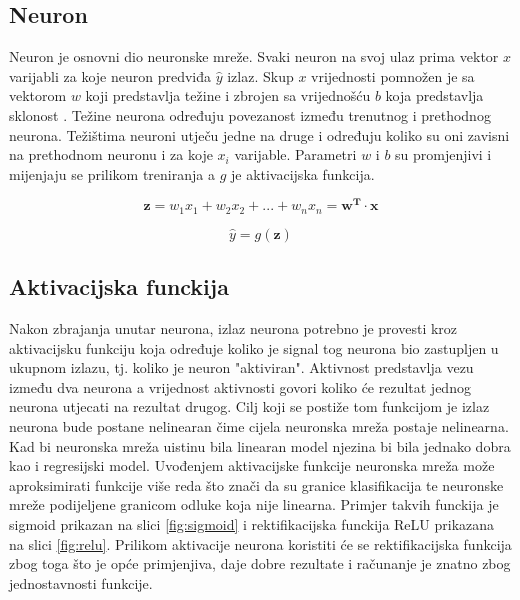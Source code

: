 \documentclass[times, utf8, zavrsni,numeric,pstricks]{fer}
\newcommand{\vect}[1]{\boldsymbol{#1}}
\begin{document}
\subsection{Neuron}
Neuron je osnovni dio neuronske mreže. Svaki neuron na svoj ulaz prima vektor $x$ varijabli za koje neuron predviđa $\hat{y}$ izlaz. Skup $x$ vrijednosti pomnožen je sa vektorom $w$ koji predstavlja težine  i zbrojen sa vrijednošću $b$ koja predstavlja sklonost . Težine neurona određuju povezanost između trenutnog i prethodnog neurona. Težištima neuroni utječu jedne na druge i određuju koliko su oni zavisni na prethodnom neuronu i za koje $x_i$ varijable. Parametri $w$ i $b$ su promjenjivi i mijenjaju se prilikom treniranja a $g$ je aktivacijska funkcija.


\begin{equation}\label{eq:neuron}
	\vect{z}=w_1x_1+w_2x_2+...+w_nx_n=\vect{w^{T}} \cdot \vect{x}
\end{equation}

\begin{equation}\label{eq:neuron_activation}
	\hat{y} = g(\vect{z})
\end{equation}

\subsection{Aktivacijska funckija}

Nakon zbrajanja unutar neurona, izlaz neurona potrebno je provesti kroz aktivacijsku funkciju koja određuje koliko je signal tog neurona bio zastupljen u ukupnom izlazu, tj. koliko je neuron "aktiviran". Aktivnost predstavlja vezu između dva neurona a vrijednost aktivnosti govori koliko će rezultat jednog neurona utjecati na rezultat drugog. Cilj koji se postiže tom funkcijom je izlaz neurona bude postane nelinearan čime cijela neuronska mreža postaje nelinearna. Kad bi neuronska mreža uistinu bila linearan model njezina bi bila jednako dobra kao i regresijski model. Uvođenjem aktivacijske funkcije neuronska mreža može aproksimirati funkcije više reda što znači da su granice klasifikacija te neuronske mreže podijeljene granicom odluke  koja nije linearna. Primjer takvih funckija je sigmoid prikazan na slici \ref{fig:sigmoid} i rektifikacijska funckija ReLU  prikazana na slici \ref{fig:relu}. Prilikom aktivacije neurona koristiti će se rektifikacijska funkcija zbog toga što je opće primjenjiva, daje dobre rezultate i računanje je znatno zbog jednostavnosti funkcije.
\end{document}
